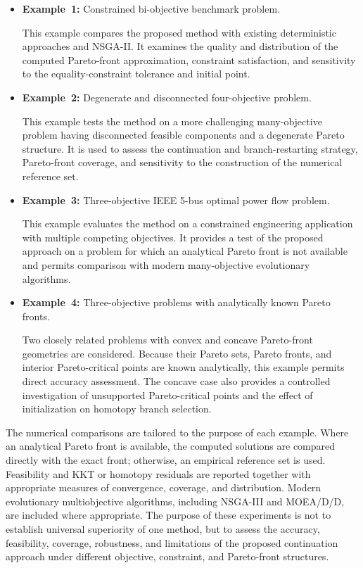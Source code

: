 \documentclass[11pt,pdflatex,sn-mathphys-ay]{sn-jnl}%
\theoremstyle{definition}
\theoremstyle{thmstyleone}%
\theoremstyle{thmstyletwo}%
\theoremstyle{thmstylethree}%
\newcommand{\add}[1]{\textcolor{revisionblue}{#1}}
\begin{document}
	\begin{itemize}
		\item \textbf{Example~1:} Constrained bi-objective benchmark problem.
		
		This example compares the proposed method with existing deterministic
		approaches and NSGA-II. It examines the quality and distribution of
		the computed Pareto-front approximation, constraint satisfaction,
		and sensitivity to the equality-constraint tolerance and initial
		point.
		
		\item \textbf{Example~2:} Degenerate and disconnected four-objective
		problem.
		
		This example tests the method on a more challenging many-objective
		problem having disconnected feasible components and a degenerate
		Pareto structure. It is used to assess the continuation and
		branch-restarting strategy, Pareto-front coverage, and sensitivity
		to the construction of the numerical reference set.
		
		\item \textbf{Example~3:} Three-objective IEEE 5-bus optimal power
		flow problem.
		
		This example evaluates the method on a constrained engineering
		application with multiple competing objectives. It provides a test
		of the proposed approach on a problem for which an analytical Pareto
		front is not available and permits comparison with modern
		many-objective evolutionary algorithms.
		
		\item \textbf{Example~4:} Three-objective problems with analytically
		known Pareto fronts.
		
		\add{Two closely related problems with convex and concave Pareto-front
			geometries are considered. Because their Pareto sets, Pareto fronts,
			and interior Pareto-critical points are known analytically, this
			example permits direct accuracy assessment. The concave case also
			provides a controlled investigation of unsupported Pareto-critical
			points and the effect of initialization on homotopy branch selection.}
	\end{itemize}
	
	\add{The numerical comparisons are tailored to the purpose of each example.
		Where an analytical Pareto front is available, the computed solutions
		are compared directly with the exact front; otherwise, an empirical
		reference set is used. Feasibility and KKT or homotopy residuals are
		reported together with appropriate measures of convergence, coverage,
		and distribution. Modern evolutionary multiobjective algorithms,
		including NSGA-III and MOEA/D/D, are included where appropriate. The
		purpose of these experiments is not to establish universal superiority
		of one method, but to assess the accuracy, feasibility, coverage,
		robustness, and limitations of the proposed continuation approach under
		different objective, constraint, and Pareto-front structures.}
	
\end{document}
